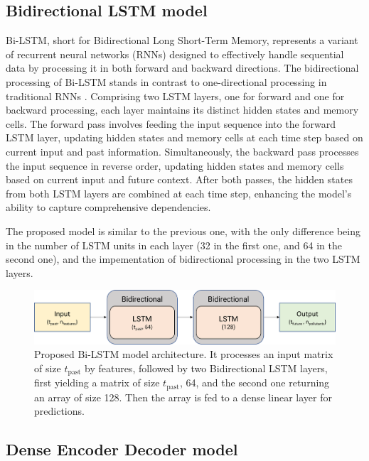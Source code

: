 \subsection*{Bidirectional LSTM model}


Bi-LSTM, short for Bidirectional Long Short-Term Memory, represents a variant of recurrent neural networks (RNNs) designed to effectively handle sequential data by processing it in both forward and backward directions.
The bidirectional processing of Bi-LSTM stands in contrast to one-directional processing in traditional RNNs \cite{Schuster1997BidirectionalRN}. Comprising two LSTM layers, one for forward and one for backward processing, each layer maintains its distinct hidden states and memory cells.
The forward pass involves feeding the input sequence into the forward LSTM layer, updating hidden states and memory cells at each time step based on current input and past information. Simultaneously, the backward pass processes the input sequence in reverse order, updating hidden states and memory cells based on current input and future context. After both passes, the hidden states from both LSTM layers are combined at each time step, enhancing the model's ability to capture comprehensive dependencies.

The proposed model is similar to the previous one, with the only difference being in the number of LSTM units in each layer (32 in the first one, and 64 in the second one), and the impementation of bidirectional processing in the two LSTM layers.

\begin{figure}
    \centering
    \includegraphics[width=0.7\linewidth]{images/model architectures/bilstmmodel.png}
    \caption{Proposed Bi-LSTM model architecture. It processes an input matrix of size $t_{\text{past}}$ by features, followed by two Bidirectional LSTM layers, first yielding a matrix of size $t_{\text{past}}$, 64, and the second one returning an array of size 128. Then the array is fed to a dense linear layer for predictions.
    }
    \label{fig:bilstmmodel}
\end{figure}

\subsection*{Dense Encoder Decoder model}

